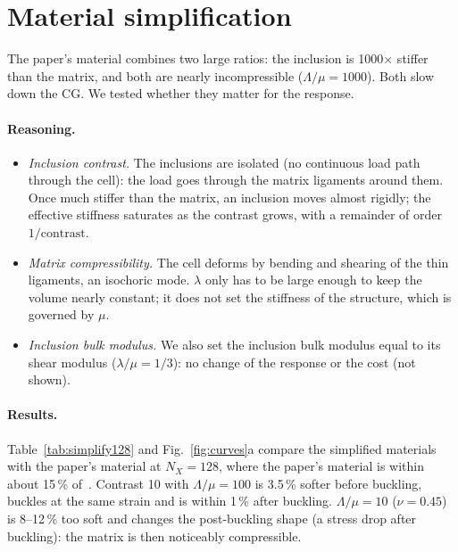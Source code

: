 \documentclass[11pt,a4paper]{article}
\begin{document}
\section{Material simplification}
\label{sec:simplification}

The paper's material combines two large ratios: the inclusion is 1000$\times$ stiffer than the matrix, and both are
nearly incompressible ($\Lambda/\mu = 1000$). Both slow down the CG. We tested whether they matter for the response.

\paragraph{Reasoning.}
\begin{itemize}
\item \emph{Inclusion contrast.} The inclusions are isolated (no continuous load path through the cell): the load
goes through the matrix ligaments around them. Once much stiffer than the matrix, an inclusion moves almost
rigidly; the effective stiffness saturates as the contrast grows, with a remainder of order $1/\text{contrast}$.
\item \emph{Matrix compressibility.} The cell deforms by bending and shearing of the thin ligaments, an isochoric
mode. $\lambda$ only has to be large enough to keep the volume nearly constant; it does not set the stiffness of the
structure, which is governed by $\mu$.
\item \emph{Inclusion bulk modulus.} We also set the inclusion bulk modulus equal to its shear modulus
($\lambda/\mu = 1/3$): no change of the response or the cost (not shown).
\end{itemize}

\paragraph{Results.} Table~\ref{tab:simplify128} and Fig.~\ref{fig:curves}a compare the simplified materials with
the paper's material at $N_X = 128$, where the paper's material is within about 15\,\% of~\cite{LiRudykh2019}.
Contrast 10 with $\Lambda/\mu = 100$ is 3.5\,\% softer before buckling, buckles at the same strain and is within 1\,\%
after buckling. $\Lambda/\mu = 10$ ($\nu = 0.45$) is 8--12\,\% too soft and changes the post-buckling shape (a stress
drop after buckling): the matrix is then noticeably compressible.
\end{document}
